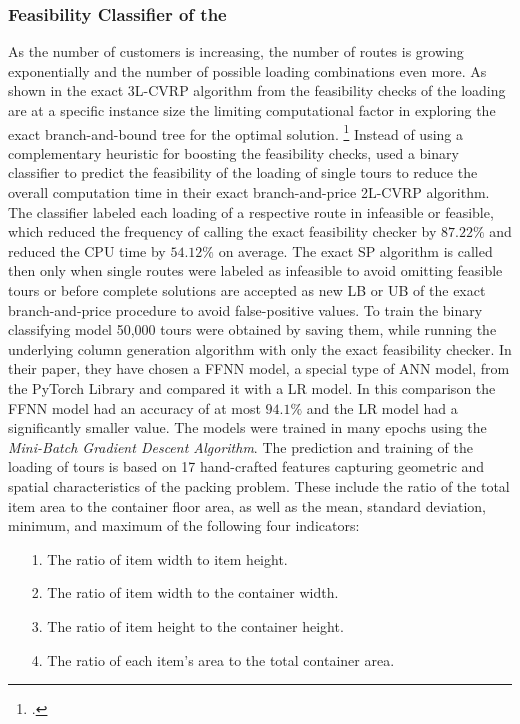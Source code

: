 \subsubsection{Feasibility Classifier of the }
As the number of customers is increasing, the number of routes is growing exponentially and the number of
possible loading combinations even more. As shown in the exact \gls{3L-CVRP} algorithm from \cite{tamke_branch-and-cut_2024}
the feasibility checks of the loading are at a specific instance size the limiting computational factor in
exploring the exact branch-and-bound tree for the optimal solution. \footcite[cf.][p.22]{tamke_branch-and-cut_2024}
Instead of using a complementary heuristic for boosting the feasibility checks,
\textcite{zhang_learning-based_2022} used a binary classifier to predict the feasibility of the
loading of single tours to reduce the overall computation time in their exact branch-and-price \gls{2L-CVRP}
algorithm. The classifier labeled each loading of a respective route in infeasible or feasible, which
reduced the frequency of calling the exact feasibility checker by $87.22\%$ and reduced the CPU time by $54.12\%$ on average.
The exact \gls{SP} algorithm is called then only when single routes were labeled as infeasible to avoid
omitting feasible tours or before complete solutions are accepted as new \gls{LB} or \gls{UB} of the
exact branch-and-price procedure to avoid false-positive values. To train the binary classifying model
50,000 tours were obtained by saving them, while running the underlying column generation
algorithm with only the exact feasibility checker. In their paper, they have chosen a \gls{FFNN} model, a special type of \gls{ANN} model,
from the PyTorch Library and compared it with a \gls{LR} model. In this comparison the \gls{FFNN} model had
an accuracy of at most $94.1\%$ and the \gls{LR} model had a significantly smaller value.
The models were trained in many epochs using the \textit{Mini-Batch Gradient Descent Algorithm}. The prediction and training
of the loading of tours is based on 17 hand-crafted features capturing geometric
and spatial characteristics of the packing problem. These include the ratio of the total item area
to the container floor area, as well as the mean, standard deviation, minimum, and maximum of
the following four indicators:
\begin{itemize}
    \item[1.] The ratio of item width to item height.
    \item[2.] The ratio of item width to the container width.
    \item[3.] The ratio of item height to the container height.
    \item[4.] The ratio of each item’s area to the total container area.
\end{itemize}

